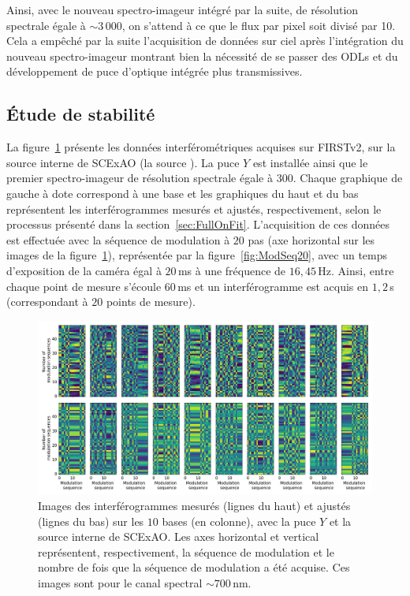 Ainsi, avec le nouveau spectro-imageur intégré par la suite, de résolution spectrale égale à $\sim 3\,000$, on s'attend à ce que le flux par pixel soit divisé par 10. Cela a empêché par la suite l'acquisition de données sur ciel après l'intégration du nouveau spectro-imageur montrant bien la nécessité de se passer des \ac{ODL}s et du développement de puce d'optique intégrée plus transmissives.


\subsection{Étude de stabilité}
\label{sec:V2StabilitySubaru}

La figure~\ref{fig:FullOnDataSCExAO} présente les données interférométriques acquises sur \ac{FIRSTv2}, sur la source interne de \ac{SCExAO} (la source \sk). La puce $Y$ est installée ainsi que le premier spectro-imageur de résolution spectrale égale à $300$. Chaque graphique de gauche à dote correspond à une base et les graphiques du haut et du bas représentent les interférogrammes mesurés et ajustés, respectivement, selon le processus présenté dans la section~\ref{sec:FullOnFit}. L'acquisition de ces données est effectuée avec la séquence de modulation à $20$ pas (axe horizontal sur les images de la figure~\ref{fig:FullOnDataSCExAO}), représentée par la figure~\ref{fig:ModSeq20}, avec un temps d'exposition de la caméra égal à $20 \,$ms à une fréquence de $16,45 \,$Hz. Ainsi, entre chaque point de mesure s'écoule $60 \,$ms et un interférogramme est acquis en $1,2 \,$s (correspondant à $20$ points de mesure).

\begin{figure}[ht!]
    \centering
    \includegraphics[width=\figwidth]{Figure_Chap5/20220225_SuperK_FringeFitting_TemporalModulation_Pola1_Base_LaTex.png}
    \caption[Images des interférogrammes mesurés et ajustés, avec la puce $Y$ sur la source interne de SCExAO.]{Images des interférogrammes mesurés (lignes du haut) et ajustés (lignes du bas) sur les $10$ bases (en colonne), avec la puce $Y$ et la source interne de SCExAO. Les axes horizontal et vertical représentent, respectivement, la séquence de modulation et le nombre de fois que la séquence de modulation a été acquise. Ces images sont pour le canal spectral $\sim 700 \,$nm.}
    \label{fig:FullOnDataSCExAO}
\end{figure}

